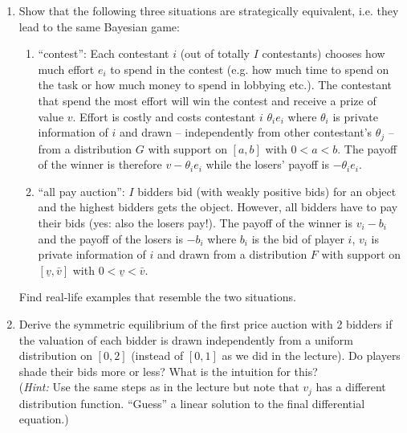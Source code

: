 \documentclass[a4paper,12pt]{article}
\begin{document}
\begin{enumerate}[resume]
\item\label{ex:stratEq} Show that the following three situations are strategically equivalent, i.e. they lead to the same Bayesian game:
  \begin{enumerate}
  \item ``contest'': Each contestant $i$ (out of totally $I$ contestants) chooses how much effort $e_i$ to spend in the contest (e.g. how much time to spend on the task or how much money to spend in lobbying etc.). The contestant that spend the most effort will win the contest and receive a prize of value $v$. Effort is costly and costs contestant $i$ $\theta _ie_i$ where $\theta _i$ is private information of $i$ and drawn -- independently from other contestant's $\theta _j$ -- from a distribution $G$ with support on $[a,b]$ with $0<a<b$. The payoff of the winner is therefore $v-\theta _ie_i$ while the losers' payoff is $-\theta _ie_i$.
  \item ``all pay auction'': $I$ bidders bid (with weakly positive bids) for an object and the highest bidders gets the object. However, all bidders have to pay their bids (yes: also the losers pay!). The payoff of the winner is $v_i -b_i$ and the payoff of the losers is $-b_i$ where $b_i$ is the bid of player $i$, $v_i$ is private information of $i$ and drawn from a distribution $F$ with support on $[\underline{v},\bar{v}]$ with $0<\underline{v}<\bar{v}$.
  \end{enumerate}
  Find real-life examples that resemble the two situations.
\item Derive the symmetric equilibrium of the first price auction with 2 bidders if the valuation of each bidder is drawn independently from a uniform distribution on $[0,2]$ (instead of $[0,1]$ as we did in the lecture). Do players shade their bids more or less? What is the intuition for this?\\
  (\emph{Hint:} Use the same steps as in the lecture but note that $v_j$ has a different distribution function. ``Guess'' a linear solution to the final differential equation.)

\end{enumerate}
\end{document}
